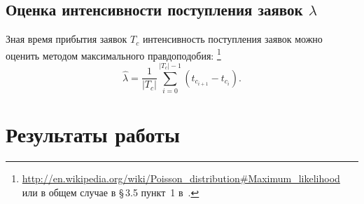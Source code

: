 \documentclass[a4paper,10pt]{article}
\begin{document}
\subsection{Оценка интенсивности поступления заявок $\lambda$}
Зная время прибытия заявок $T_c$ интенсивность поступления заявок можно оценить
методом максимального правдоподобия:
\footnote{{\url{http://en.wikipedia.org/wiki/Poisson\_distribution\#Maximum\_likelihood}} 
или в общем случае в \S\,3.5 пункт~1 в~\cite{ivchmed2010matstat}.}
$$\widehat{\lambda} = 
    \frac{1}{|T_c|} \sum\limits_{i=0}^{|T_c| - 1} (t_{c_{i+1}} - t_{c_i}).$$

\section{Результаты работы}




\pagebreak



\end{document}
